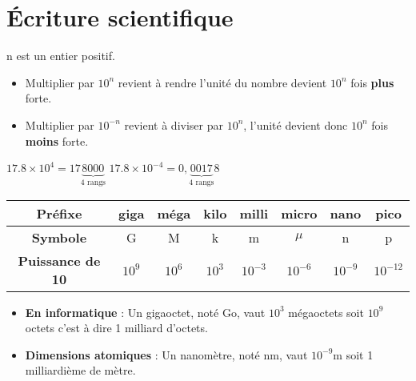 \section{Écriture scientifique}
\begin{propriete}
    n est un entier positif.
    \begin{itemize}
        \item Multiplier par $10^n$ revient à rendre l'unité du nombre devient $10^n$ fois \textbf{plus} forte.
        \item Multiplier par $10^{-n}$ revient à diviser par $10^n$, l'unité devient donc $10^n$ fois \textbf{moins} forte.
    \end{itemize}
\end{propriete}

\begin{exemples*1}

    $\num{17.8} \times 10^4 = 17\underbrace{\num{8 000}}_{\text{4 rangs}}$\hspace*{20mm} $\num{17.8} \times 10^{-4} = 0,\underbrace{0017}_{\text{4 rangs}}8$
\end{exemples*1}

\begin{definition}
    {\renewcommand{\arraystretch}{1.5}
    \begin{tabular}{||c||c||c||c||c||c||c||c||}
        \hline 
        \rule[-1ex]{0pt}{2.5ex} {\bfseries Préfixe} & giga & méga & kilo & milli & micro & nano & pico \\ 
        \hline 
        \rule[-1ex]{0pt}{2.5ex} {\bfseries Symbole} & G & M & k & m & $\mu$ & n & p \\ 
        \hline 
        \rule[-1ex]{0pt}{2.5ex} {\bfseries Puissance de 10} & $10^{9}$ & $10^{6}$ & $10^{3}$ & $10^{-3}$ & $10^{-6}$ & $10^{-9}$ & $10^{-12}$ \\ 
        \hline 
    \end{tabular} 
    }
\end{definition}

\begin{exemples*1}

    \begin{itemize}
        \item \textbf{En informatique} : Un gigaoctet, noté Go, vaut $10^{3}$ mégaoctets soit $10^{9}$ octets c'est à dire 1 milliard d'octets.
        \item \textbf{Dimensions atomiques} : Un nanomètre, noté nm, vaut $10^{-9}$m soit 1 milliardième de mètre.
    \end{itemize}
\end{exemples*1}

